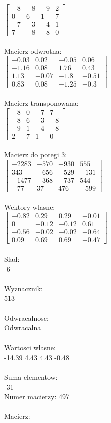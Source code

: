 \documentclass[a4paper,12pt]{article}
\begin{document}
$\begin{bmatrix} -8&-8&-9&2\\0&6&1&7\\-7&-3&-4&1\\7&-8&-8&0 \end{bmatrix}$
\\
\\
Macierz odwrotna:\\

$\begin{bmatrix} -0.03&0.02&-0.05&0.06\\-1.16&0.08&1.76&0.43\\1.13&-0.07&-1.8&-0.51\\0.83&0.08&-1.25&-0.3 \end{bmatrix}$
\\
\\
Macierz transponowana:\\

$\begin{bmatrix} -8&0&-7&7\\-8&6&-3&-8\\-9&1&-4&-8\\2&7&1&0 \end{bmatrix}$
\\
\\
Macierz do potegi 3:\\

$\begin{bmatrix} -2283&-570&-930&555\\343&-656&-529&-131\\-1477&-368&-737&544\\-77&37&476&-599 \end{bmatrix}$
\\
\\
Wektory wlasne:\\

$\begin{bmatrix} -0.82&0.29&0.29&-0.01\\0&-0.12&-0.12&0.61\\-0.56&-0.02&-0.02&-0.64\\0.09&0.69&0.69&-0.47 \end{bmatrix}$
\\
\\
Slad:\\
-6
\\
\\
Wyznacznik:\\
513
\\
\\
Odwracalnosc:\\
Odwracalna
\\
\\
Wartosci wlasne:\\
-14.39 4.43 4.43 -0.48
\\
\\
Suma elementow:\\
-31
\\
\newpage
Numer macierzy:
497
\\
\\
Macierz:\\
\end{document}
